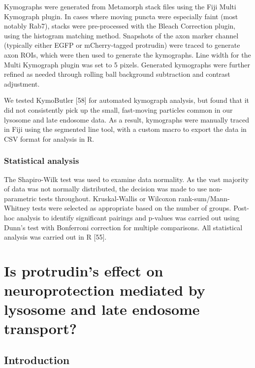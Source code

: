 \documentclass[
  12pt,
  a4paper,
]{book}
\renewcommand{\chaptermark}[1]{\markboth{#1}{}}
\begin{document}
Kymographs were generated from Metamorph stack files using the Fiji Multi Kymograph plugin. In cases where moving puncta were especially faint (most notably Rab7), stacks were pre-processed with the Bleach Correction plugin, using the histogram matching method. Snapshots of the axon marker channel (typically either EGFP or mCherry-tagged protrudin) were traced to generate axon ROIs, which were then used to generate the kymographs. Line width for the Multi Kymograph plugin was set to 5 pixels. Generated kymographs were further refined as needed through rolling ball background subtraction and contrast adjustment.

We tested KymoButler {[}58{]} for automated kymograph analysis, but found that it did not consistently pick up the small, fast-moving particles common in our lysosome and late endosome data. As a result, kymographs were manually traced in Fiji using the segmented line tool, with a custom macro to export the data in CSV format for analysis in R.

\hypertarget{statistical-analysis}{%
\subsection{Statistical analysis}\label{statistical-analysis}}

The Shapiro-Wilk test was used to examine data normality. As the vast majority of data was not normally distributed, the decision was made to use non-parametric tests throughout. Kruskal-Wallis or Wilcoxon rank-sum/Mann-Whitney tests were selected as appropriate based on the number of groups. Post-hoc analysis to identify significant pairings and p-values was carried out using Dunn's test with Bonferroni correction for multiple comparisons. All statistical analysis was carried out in R {[}55{]}.

\hypertarget{is-protrudins-effect-on-neuroprotection-mediated-by-lysosome-and-late-endosome-transport}{%
\chapter{Is protrudin's effect on neuroprotection mediated by lysosome and late endosome transport?}\label{is-protrudins-effect-on-neuroprotection-mediated-by-lysosome-and-late-endosome-transport}}

\chaptermark{Lysosome and late endosome transport}

\hypertarget{introduction}{%
\section{Introduction}\label{introduction}}
\end{document}
